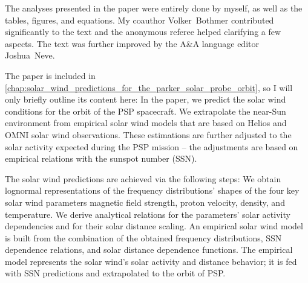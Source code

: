 The analyses presented in the paper were entirely done by myself, as well as the tables, figures, and equations. My coauthor Volker~Bothmer contributed significantly to the text and the anonymous referee helped clarifying a few aspects. The text was further improved by the A\&A language editor Joshua~Neve.

The paper is included in \autoref{chap:solar_wind_predictions_for_the_parker_solar_probe_orbit}, so I will only briefly outline its content here: In the paper, we predict the solar wind conditions for the orbit of the PSP spacecraft. We extrapolate the near-Sun environment from empirical solar wind models that are based on Helios and OMNI solar wind observations. These estimations are further adjusted to the solar activity expected during the PSP mission -- the adjustments are based on empirical relations with the sunspot number (SSN).

The solar wind predictions are achieved via the following steps: We obtain lognormal representations of the frequency distributions’ shapes of the four key solar wind parameters magnetic field strength, proton velocity, density, and temperature. We derive analytical relations for the parameters’ solar activity dependencies and for their solar distance scaling. An empirical solar wind model is built from the combination of the obtained frequency distributions, SSN dependence relations, and solar distance dependence functions. The empirical model represents the solar wind’s solar activity and distance behavior; it is fed with SSN predictions and extrapolated to the orbit of PSP.

